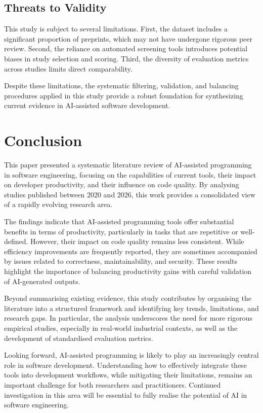 \documentclass[conference]{IEEEtran}
\begin{document}
\subsection{Threats to Validity}

This study is subject to several limitations. First, the dataset includes a significant proportion of preprints, which may not have undergone rigorous peer review. Second, the reliance on automated screening tools introduces potential biases in study selection and scoring. Third, the diversity of evaluation metrics across studies limits direct comparability.

Despite these limitations, the systematic filtering, validation, and balancing procedures applied in this study provide a robust foundation for synthesizing current evidence in AI-assisted software development.

\section{Conclusion}

This paper presented a systematic literature review of AI-assisted programming in software engineering, focusing on the capabilities of current tools, their impact on developer productivity, and their influence on code quality. By analysing studies published between 2020 and 2026, this work provides a consolidated view of a rapidly evolving research area.

The findings indicate that AI-assisted programming tools offer substantial benefits in terms of productivity, particularly in tasks that are repetitive or well-defined. However, their impact on code quality remains less consistent. While efficiency improvements are frequently reported, they are sometimes accompanied by issues related to correctness, maintainability, and security. These results highlight the importance of balancing productivity gains with careful validation of AI-generated outputs.

Beyond summarising existing evidence, this study contributes by organising the literature into a structured framework and identifying key trends, limitations, and research gaps. In particular, the analysis underscores the need for more rigorous empirical studies, especially in real-world industrial contexts, as well as the development of standardised evaluation metrics.

Looking forward, AI-assisted programming is likely to play an increasingly central role in software development. Understanding how to effectively integrate these tools into development workflows, while mitigating their limitations, remains an important challenge for both researchers and practitioners. Continued investigation in this area will be essential to fully realise the potential of AI in software engineering.



\end{document}
